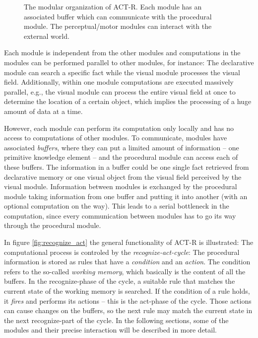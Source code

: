 \begin{figure}[hbt]
\begin{center}
\caption{The modular organization of ACT-R. Each module has an associated buffer which can communicate with the procedural module. The perceptual/motor modules can interact with the external world. \cite[fig. 1]{anderson_integrated_2004}}
\label{fig:modular_organization}
\end{center}
\end{figure}


Each module is independent from the other modules and computations in the modules can be performed parallel to other modules, for instance: The declarative module can search a specific fact while the visual module processes the visual field. Additionally, within one module computations are executed massively parallel, e.g., the visual module can process the entire visual field at once to determine the location of a certain object, which implies the processing of a huge amount of data at a time.

However, each module can perform its computation only locally and has no access to computations of other modules. To communicate, modules have associated \emph{buffers}, where they can put a limited amount of information -- one primitive knowledge element -- and the procedural module can access each of these buffers. The information in a buffer could be one single fact retrieved from declarative memory or one visual object from the visual field perceived by the visual module. Information between modules is exchanged by the procedural module taking information from one buffer and putting it into another (with an optional computation on the way). This leads to a serial bottleneck in the computation, since every communication between modules has to go its way through the procedural module.

In figure \ref{fig:recognize_act} the general functionality of ACT-R is illustrated: The computational process is controled by the \emph{recognize-act-cycle}: The procedural information is stored as rules that have a \emph{condition} and an \emph{action}. The condition refers to the so-called \emph{working memory}, which basically is the content of all the buffers. In the recognize-phase of the cycle, a suitable rule that matches the current state of the working memory is searched. If the condition of a rule holds, it \emph{fires} and performs its actions -- this is the act-phase of the cycle. Those actions can cause changes on the buffers, so the next rule may match the current state in the next recognize-part of the cycle. In the following sections, some of the modules and their precise interaction will be described in more detail.

